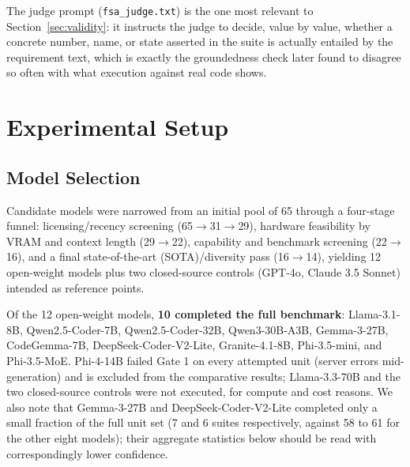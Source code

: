 \documentclass[conference]{IEEEtran}
\begin{document}
  The judge prompt (\texttt{fsa\_judge.txt}) is the one most relevant to
  Section~\ref{sec:validity}: it instructs the judge to decide, value by value,
  whether a concrete number, name, or state asserted in the suite is actually
  entailed by the requirement text, which is exactly the groundedness check
  later found to disagree so often with what execution against real code shows.

  \section{Experimental Setup}
  \label{sec:setup}

  \subsection{Model Selection}
  Candidate models were narrowed from an initial pool of 65 through a
  four-stage funnel: licensing/recency screening (65$\rightarrow$31$\rightarrow$29),
  hardware feasibility by VRAM and context length (29$\rightarrow$22), capability
  and benchmark screening (22$\rightarrow$16), and a final state-of-the-art
  (SOTA)/diversity pass
  (16$\rightarrow$14), yielding 12 open-weight models plus two closed-source
  controls (GPT-4o, Claude 3.5 Sonnet) intended as reference points.

  Of the 12 open-weight models, \textbf{10 completed the full benchmark}:
  Llama-3.1-8B, Qwen2.5-Coder-7B, Qwen2.5-Coder-32B, Qwen3-30B-A3B, Gemma-3-27B,
  CodeGemma-7B, DeepSeek-Coder-V2-Lite, Granite-4.1-8B, Phi-3.5-mini, and
  Phi-3.5-MoE. Phi-4-14B failed Gate 1 on every attempted unit (server errors
  mid-generation) and is excluded from the comparative results; Llama-3.3-70B
  and the two closed-source controls were not executed, for compute and cost
  reasons. We also note that Gemma-3-27B and DeepSeek-Coder-V2-Lite completed
  only a small fraction of the full unit set (7 and 6 suites respectively,
  against 58 to 61 for the other eight models); their aggregate statistics
  below should be read with correspondingly lower confidence.
\end{document}
